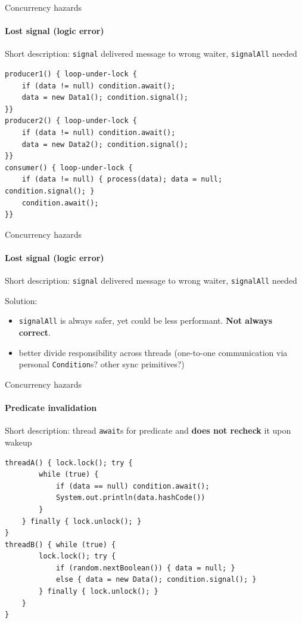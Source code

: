 \begin{frame}{Concurrency hazards}
\framesubtitle{Lost signal (logic error)}
Short description: \texttt{signal} delivered message to wrong waiter, \texttt{signalAll} needed

\begin{verbatim}
producer1() { loop-under-lock {
    if (data != null) condition.await();
    data = new Data1(); condition.signal();
}}
producer2() { loop-under-lock {
    if (data != null) condition.await();
    data = new Data2(); condition.signal();
}}
consumer() { loop-under-lock {
    if (data != null) { process(data); data = null; condition.signal(); }
    condition.await();
}}
\end{verbatim}
\end{frame}

\begin{frame}{Concurrency hazards}
\framesubtitle{Lost signal (logic error)}
Short description: \texttt{signal} delivered message to wrong waiter, \texttt{signalAll} needed

Solution:
\begin{itemize}
    \item \texttt{signalAll} is always safer, yet could be less performant. \textbf{Not always correct}.
    \item better divide responsibility across threads (one-to-one communication via personal \texttt{Condition}s? other sync primitives?)
\end{itemize}
\end{frame}

\begin{frame}[t,fragile]{Concurrency hazards}
\framesubtitle{Predicate invalidation}

Short description: thread \texttt{await}s for predicate and \textbf{does not recheck} it upon wakeup

\begin{verbatim}
threadA() { lock.lock(); try {
        while (true) {
            if (data == null) condition.await();
            System.out.println(data.hashCode())            
        }
    } finally { lock.unlock(); } 
}
threadB() { while (true) {
        lock.lock(); try {
            if (random.nextBoolean()) { data = null; } 
            else { data = new Data(); condition.signal(); }
        } finally { lock.unlock(); }
    }
}
\end{verbatim}
\end{frame}

